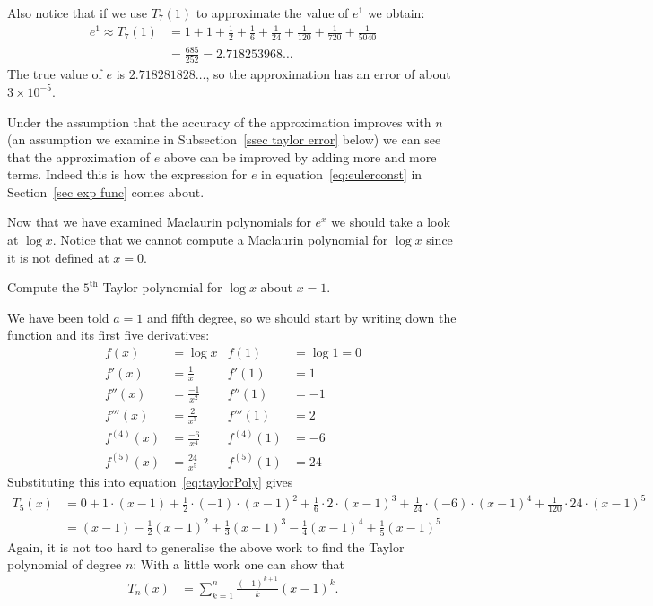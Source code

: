 \begin{eg}
\begin{efig}
\begin{center}
\end{center}
\end{efig}
Also notice that if we use $T_7(1)$ to approximate the value of $e^1$ we obtain:
\begin{align*}
  e^1 \approx T_7(1) &= 1 + 1 + \frac{1}{2} + \frac{1}{6} + \frac{1}{24} + \frac{1}{120}
+ \frac{1}{720} + \frac{1}{5040} \\
  &= \frac{685}{252} =  2.718253968\dots
\end{align*}
The true value of $e$ is $2.718281828\dots$, so the approximation has an error of about
$3\times10^{-5}$.

Under the assumption that the accuracy of the approximation improves with
$n$ (an assumption we examine in Subsection~\ref{ssec taylor error} below) we can see
that the approximation of $e$ above can be improved by adding more and more terms. Indeed
this is how the expression for $e$ in equation~\eqref{eq:eulerconst} in
Section~\ref{sec exp func} comes about.
\end{eg}
Now that we have examined Maclaurin polynomials for $e^x$ we should take a look at $\log
x$. Notice that we cannot compute a Maclaurin polynomial for $\log x$ since it is not
defined at $x=0$.
\begin{eg}\label{eg expand logx}
Compute the $5^\mathrm{th}$ Taylor polynomial for $\log x$ about $x=1$.

\soln We have been told $a=1$ and fifth degree, so we should start by writing down the
function and its first five derivatives:
\begin{align*}
  f(x) &= \log x & f(1) &= \log 1 = 0 \\
  f'(x) &= \frac{1}{x} & f'(1) &= 1 \\
  f''(x) &= \frac{-1}{x^2} & f''(1) &= -1 \\
  f'''(x) &= \frac{2}{x^3} & f'''(1) &= 2 \\
  f^{(4)}(x) &= \frac{-6}{x^4} & f^{(4)}(1) &= -6 \\
  f^{(5)}(x) &= \frac{24}{x^5} & f^{(5)}(1) &= 24
\end{align*}
Substituting this into equation~\eqref{eq:taylorPoly} gives
\begin{align*}
  T_5(x)&= 0 + 1\cdot (x-1)
  + \frac{1}{2} \cdot (-1) \cdot (x-1)^2
  + \frac{1}{6} \cdot 2 \cdot (x-1)^3
  + \frac{1}{24} \cdot (-6) \cdot (x-1)^4
  + \frac{1}{120} \cdot 24 \cdot (x-1)^5 \\
  &= (x-1) - \frac{1}{2}(x-1)^2 + \frac{1}{3}(x-1)^3 - \frac{1}{4}(x-1)^4 +
\frac{1}{5}(x-1)^5
\end{align*}
Again, it is not too hard to generalise the above work to find the Taylor polynomial of
degree $n$:
With a little work one can show that
\begin{align*}
  T_n(x) &= \sum_{k=1}^n \frac{(-1)^{k+1}}{k} (x-1)^k.
\end{align*}
\end{eg}
